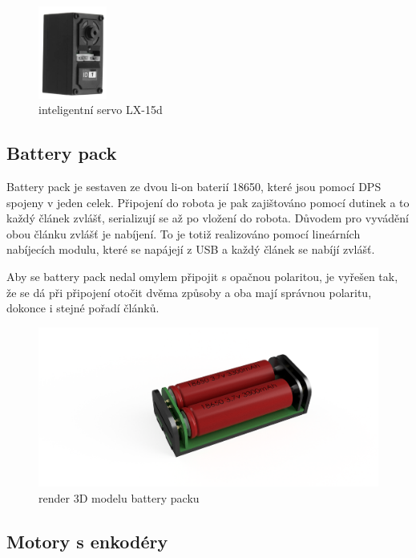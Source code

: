 \documentclass{template/socthesis}
\begin{document}
\begin{figure}[h]
	
	\centering
	\includegraphics[width=0.2\textwidth]{img/LX-15d.png}
	\caption{inteligentní servo LX-15d \cite{inteligentni_servo_LX15D}}
	
\end{figure}

\subsection{Battery pack}

Battery pack je sestaven ze dvou li-on baterií 18650, které jsou pomocí DPS spojeny v jeden celek. Připojení do robota je pak zajištováno pomocí dutinek a to každý článek zvlášť, serializují se až po vložení do robota. Důvodem pro vyvádění obou článku zvlášť je nabíjení. To je totiž realizováno pomocí lineárních nabíjecích modulu, které se napájejí z USB a každý článek se nabíjí zvlášť.

Aby se battery pack nedal omylem připojit s opačnou polaritou, je vyřešen tak, že se dá při připojení otočit dvěma způsoby a oba mají správnou polaritu, dokonce i stejné pořadí článků.

\begin{figure}[h]
	\centering
	\includegraphics[width=1\textwidth]{img/battery_pack_v3.png}
	\caption{render 3D modelu battery packu}
\end{figure}

\subsection{Motory s enkodéry}
\end{document}
